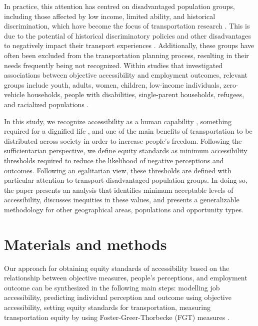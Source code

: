 \documentclass[preprint, 3p,
authoryear]{elsarticle} %
\begin{document}
In practice, this attention has centred on disadvantaged population
groups, including those affected by low income, limited ability, and
historical discrimination, which have become the focus of transportation
research \citep{lucas2019}. This is due to the potential of historical
discriminatory policies and other disadvantages to negatively impact
their transport experiences \citep{pereira2021}. Additionally, these
groups have often been excluded from the transportation planning
process, resulting in their needs frequently being not recognized.
Within studies that investigated associations between objective
accessibility and employment outcomes, relevant groups include youth,
adults, women, children, low-income individuals, zero-vehicle
households, people with disabilities, single-parent households,
refugees, and racialized populations
\citep{bania2008, Hu2017, middleton2019, tabascio2024}.

In this study, we recognize accessibility as a human capability
\citep{sen2005, sen1999, pereira2017, luz2022}, something required for a
dignified life \citep{karner2020, dossantos}, and one of the main
benefits of transportation to be distributed across society in order to
increase people's freedom. Following the sufficientarian perspective, we
define equity standards as minimum accessibility thresholds required to
reduce the likelihood of negative perceptions and outcomes. Following an
egalitarian view, these thresholds are defined with particular attention
to transport-disadvantaged population groups. In doing so, the paper
presents an analysis that identifies minimum acceptable levels of
accessibility, discusses inequities in these values, and presents a
generalizable methodology for other geographical areas, populations and
opportunity types.

\section{Materials and methods}\label{materials-and-methods}

Our approach for obtaining equity standards of accessibility based on
the relationship between objective measures, people's perceptions, and
employment outcome can be synthesized in the following main steps:
modelling job accessibility, predicting individual perception and
outcome using objective accessibility, setting equity standards for
transportation, measuring transportation equity by using
Foster-Greer-Thorbecke (FGT) measures \citep{foster2010}.
\end{document}
